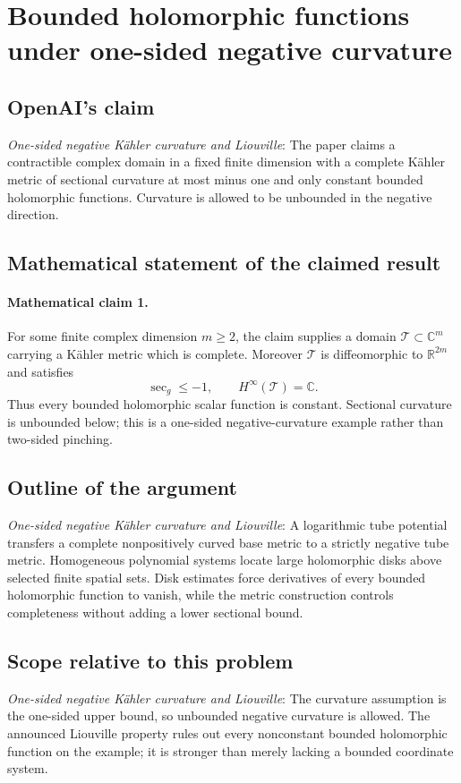 \documentclass[11pt]{article}
\begin{document}
\section*{Bounded holomorphic functions under one-sided negative curvature}

\subsection{OpenAI's claim}
\textit{One-sided negative Kähler curvature and Liouville}: The paper claims a contractible complex domain in a fixed finite dimension with a complete Kähler metric of sectional curvature at most minus one and only constant bounded holomorphic functions. Curvature is allowed to be unbounded in the negative direction.

\subsection{Mathematical statement of the claimed result}
\paragraph{Mathematical claim 1.} For some finite complex dimension $m\ge2$, the claim supplies a domain $\mathcal T\subset\mathbb C^m$ carrying a K\"ahler metric which is complete. Moreover $\mathcal T$ is diffeomorphic to $\mathbb R^{2m}$ and satisfies \[\sec_g\le-1,\qquad H^\infty(\mathcal T)=\mathbb C.\] Thus every bounded holomorphic scalar function is constant. Sectional curvature is unbounded below; this is a one-sided negative-curvature example rather than two-sided pinching.

\subsection{Outline of the argument}
\textit{One-sided negative Kähler curvature and Liouville}: A logarithmic tube potential transfers a complete nonpositively curved base metric to a strictly negative tube metric. Homogeneous polynomial systems locate large holomorphic disks above selected finite spatial sets. Disk estimates force derivatives of every bounded holomorphic function to vanish, while the metric construction controls completeness without adding a lower sectional bound.

\subsection{Scope relative to this problem}
\textit{One-sided negative Kähler curvature and Liouville}: The curvature assumption is the one-sided upper bound, so unbounded negative curvature is allowed. The announced Liouville property rules out every nonconstant bounded holomorphic function on the example; it is stronger than merely lacking a bounded coordinate system.
\end{document}
